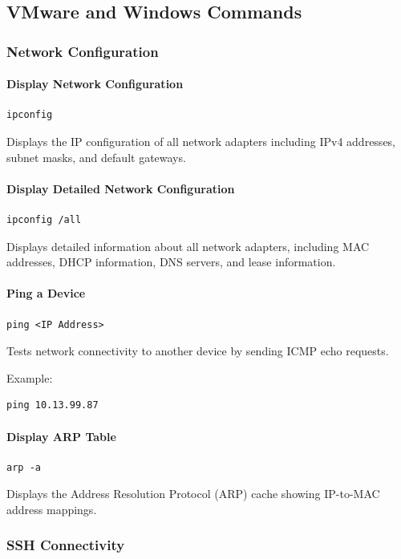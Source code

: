 \documentclass[conference]{IEEEtran}
\begin{document}
\subsection{VMware and Windows Commands}

\subsubsection{Network Configuration}

\paragraph{Display Network Configuration}
\begin{verbatim}
ipconfig
\end{verbatim}
Displays the IP configuration of all network adapters including IPv4 addresses, subnet masks, and default gateways.

\paragraph{Display Detailed Network Configuration}
\begin{verbatim}
ipconfig /all
\end{verbatim}
Displays detailed information about all network adapters, including MAC addresses, DHCP information, DNS servers, and lease information.

\paragraph{Ping a Device}
\begin{verbatim}
ping <IP Address>
\end{verbatim}
Tests network connectivity to another device by sending ICMP echo requests.

Example:
\begin{verbatim}
ping 10.13.99.87
\end{verbatim}

\paragraph{Display ARP Table}
\begin{verbatim}
arp -a
\end{verbatim}
Displays the Address Resolution Protocol (ARP) cache showing IP-to-MAC address mappings.

\subsubsection{SSH Connectivity}
\end{document}
